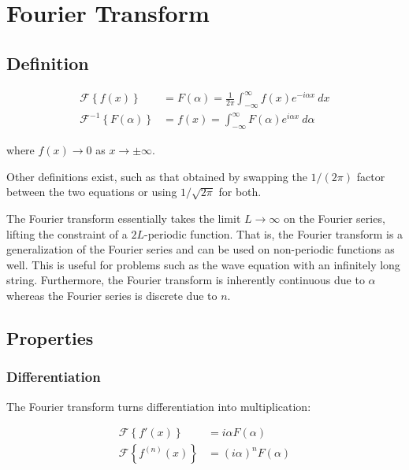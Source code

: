 \section{Fourier Transform}

\subsection{Definition}

\begin{align*}
    \mathcal{F}\left\{f(x)\right\}           & = F(\alpha) = \frac{1}{2\pi} \int_{-\infty}^\infty f(x)e^{-i\alpha x}~dx \\
    \mathcal{F}^{-1}\left\{F(\alpha)\right\} & = f(x) = \int_{-\infty}^\infty F(\alpha)e^{i\alpha x}~d\alpha
\end{align*}

where $f(x) \to 0$ as $x \to \pm\infty$.

\vsp

Other definitions exist, such as that obtained by swapping the $1/(2\pi)$ factor between the two equations or using $1/\sqrt{2\pi}$ for both.

\vsp

The Fourier transform essentially takes the limit $L \to \infty$ on the Fourier series, lifting the constraint of a $2L$-periodic function. That is, the Fourier transform is a generalization of the Fourier series and can be used on non-periodic functions as well. This is useful for problems such as the wave equation with an infinitely long string. Furthermore, the Fourier transform is inherently continuous due to $\alpha$ whereas the Fourier series is discrete due to $n$.

\subsection{Properties}

\subsubsection{Differentiation}

The Fourier transform turns differentiation into multiplication:

\begin{align*}
    \mathcal{F}\left\{f'(x)\right\}      & = i\alpha F(\alpha) \tag{1st derivative}     \\
    \mathcal{F}\left\{f^{(n)}(x)\right\} & = (i\alpha)^n F(\alpha) \tag{nth derivative} \\
\end{align*}

